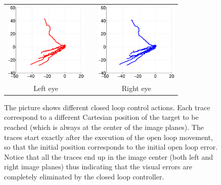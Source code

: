 \begin{figure}[th!]
  \begin{center}
	\begin{tabular}{ccc}
	  \parbox{40mm}{\includegraphics[width=40mm]{Figure/LeftEyeClosedLoop.eps}}  & \hspace{2cm} &
	  \parbox{40mm}{\includegraphics[width=40mm]{Figure/RightEyeClosedLoop.eps}}
	  \\
	  \parbox{40mm}{\centering Left eye } & \hspace{2cm} & \parbox{40mm}{\centering Right eye }
  \end{tabular}
\end{center}
\caption{The picture shows different closed loop control actions. Each trace correspond to a different Cartesian position of the target to be reached (which 
is always at the center of the image planes). The traces start exactly after the execution of the open loop movement, so that the initial position corresponds to the initial open loop error. Notice that all the traces end up in the image center (both left and right image planes) thus indicating that the visual errors are completely eliminated by the closed loop controller.}\label{Fig:ImagePlaneClosedLoopErrors}
  \end{figure}

